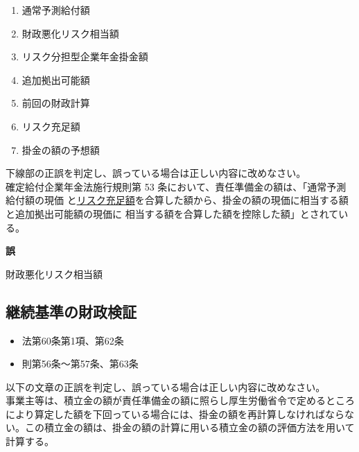 \begin{answerbox}
  \begin{enumerate}[A: ]
    \item 通常予測給付額
    \item 財政悪化リスク相当額
    \item リスク分担型企業年金掛金額
    \item 追加拠出可能額
    \item 前回の財政計算
    \item リスク充足額
    \item 掛金の額の予想額
  \end{enumerate}
\end{answerbox}

\begin{truefalse}[年金2 H29 問題1(1)\textcircled{1}]
  下線部の正誤を判定し、誤っている場合は正しい内容に改めなさい。
\\

  確定給付企業年金法施行規則第 53 条において、責任準備金の額は、「通常予測給付額の現価
と\underline{リスク充足額}を合算した額から、掛金の額の現価に相当する額と追加拠出可能額の現価に
相当する額を合算した額を控除した額」とされている。
\end{truefalse}

\begin{answerbox}
  \textbf{誤}

  財政悪化リスク相当額
\end{answerbox}

\newpage

\subsection{継続基準の財政検証}

\begin{InyouJobunbox}
  \begin{itemize}
    \item 法第60条第1項、第62条
    \item 則第56条〜第57条、第63条
  \end{itemize}
\end{InyouJobunbox}

\begin{truefalse}[年金2 2025 問題1(1)ア\ajRoman{1}]
  以下の文章の正誤を判定し、誤っている場合は正しい内容に改めなさい。
\\

  事業主等は、積立金の額が責任準備金の額に照らし厚生労働省令で定めるところ
  により算定した額を下回っている場合には、掛金の額を再計算しなければならな
  い。この積立金の額は、掛金の額の計算に用いる積立金の額の評価方法を用いて計算する。
\end{truefalse}

